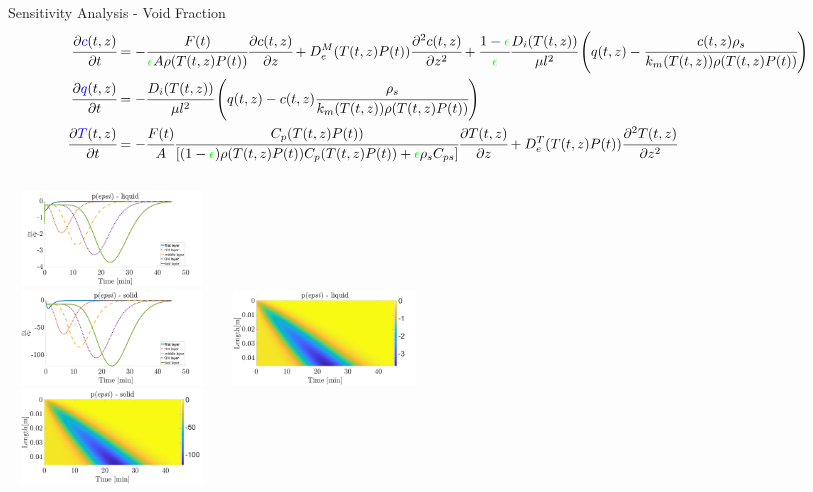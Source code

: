 \documentclass[8pt]{beamer}
\begin{document}
	\begin{frame}[fragile]{Sensitivity Analysis - Void Fraction}
		\tiny{
			\begin{align*}
				\cfrac{\partial \textcolor{blue}{c}(t,z)}{\partial t} &=  -\cfrac{F(t)}{\textcolor{green}{\epsilon}A\rho(T(t,z)P(t))} \cfrac{\partial c(t,z)}{\partial z}
				+ D^M_e(T(t,z)P(t)) \cfrac{\partial^2 c(t,z)}{\partial z^2} + \cfrac{1-\textcolor{green}{\epsilon}}{\textcolor{green}{\epsilon}} \cfrac{D_i(T(t,z))}{\mu l^2 }\left(q(t,z) - \cfrac{c(t,z)\rho_s}{k_m(T(t,z))\rho(T(t,z)P(t))} \right)\\
				\cfrac{\partial \textcolor{blue}{q}(t,z)}{\partial t} &= -\cfrac{D_i(T(t,z))}{\mu l^2}\left(q(t,z) - c(t,z) \cfrac{\rho_s}{k_m(T(t,z))\rho(T(t,z)P(t))} \right)\\
				\cfrac{\partial \textcolor{blue}{T}(t,z)}{\partial t} &= -\cfrac{F(t)}{A} \cfrac{C_p(T(t,z)P(t))}{ [(1-\textcolor{green}{\epsilon})\rho(T(t,z)P(t)) C_p(T(t,z)P(t)) + \textcolor{green}{ \epsilon}\rho_s C_{ps} ]} \cfrac{\partial T(t,z)}{\partial z} 
				+  D^T_e(T(t,z)P(t)) \cfrac{\partial^2 T(t,z)}{\partial z^2}
		\end{align*}}
		\begin{columns}[t]
			\centering
			\includegraphics[width=5.5cm,height=2.5cm]{Figures/Sensitivity/Plots/2_SS_R_epsi.png}\\
			\includegraphics[width=5.5cm,height=2.5cm]{Figures/Sensitivity/Plots/3_SS_R_epsi.png}
			\centering
			\includegraphics[width=5.5cm,height=2.5cm]{Figures/Sensitivity/Imagesc/2_SS_R_epsi.png}\\
			\includegraphics[width=5.5cm,height=2.5cm]{Figures/Sensitivity/Imagesc/3_SS_R_epsi.png}
		\end{columns}
	\end{frame}
	
\end{document}
